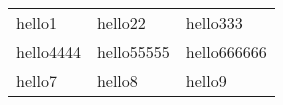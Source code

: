 \documentclass{article}
\begin{document}
\begin{tabular}{lll}
hello1&hello22&hello333\\
hello4444&hello55555&hello666666\\
hello7&hello8&hello9
\end{tabular}
\end{document}
